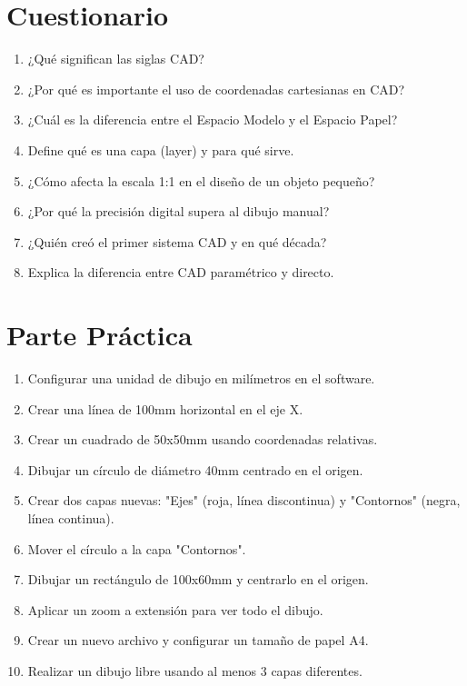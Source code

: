 \section{Cuestionario}
\begin{enumerate}
	\item ¿Qué significan las siglas CAD?
	\item ¿Por qué es importante el uso de coordenadas cartesianas en CAD?
	\item ¿Cuál es la diferencia entre el Espacio Modelo y el Espacio Papel?
	\item Define qué es una capa (layer) y para qué sirve.
	\item ¿Cómo afecta la escala 1:1 en el diseño de un objeto pequeño?
	\item ¿Por qué la precisión digital supera al dibujo manual?
	\item ¿Quién creó el primer sistema CAD y en qué década?
	\item Explica la diferencia entre CAD paramétrico y directo.
\end{enumerate}

\section{Parte Práctica}
\begin{enumerate}
	\item Configurar una unidad de dibujo en milímetros en el software.
	\item Crear una línea de 100mm horizontal en el eje X.
	\item Crear un cuadrado de 50x50mm usando coordenadas relativas.
	\item Dibujar un círculo de diámetro 40mm centrado en el origen.
	\item Crear dos capas nuevas: "Ejes" (roja, línea discontinua) y "Contornos" (negra, línea continua).
	\item Mover el círculo a la capa "Contornos".
	\item Dibujar un rectángulo de 100x60mm y centrarlo en el origen.
	\item Aplicar un zoom a extensión para ver todo el dibujo.
	\item Crear un nuevo archivo y configurar un tamaño de papel A4.
	\item Realizar un dibujo libre usando al menos 3 capas diferentes.
\end{enumerate}
